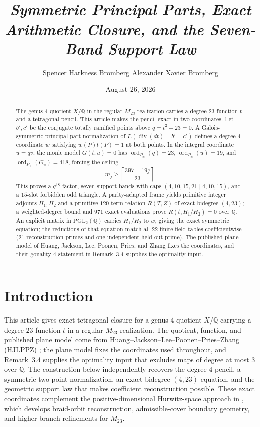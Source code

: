 \documentclass[11pt]{article}
\title{\vspace{-1.15em}{\fontsize{15.5}{18}\selectfont\bfseries Exact Tetragonal Coordinates for the Genus-$4$ $M_{23}$ Quotient}\\[-0.08em]
{\normalsize\itshape Symmetric Principal Parts, Exact Arithmetic Closure, and the Seven-Band Support Law}}
\author{Spencer Harkness Bromberg \quad Alexander Xavier Bromberg}
\date{August 26, 2026}
\newcommand{\Q}{\mathbb Q}
\begin{document}
\maketitle

\begin{abstract}
The genus-$4$ quotient $X/\Q$ in the regular $M_{23}$ realization carries a degree-$23$ function $t$ and a tetragonal pencil.  This article makes the pencil exact in two coordinates.  Let $b',c'$ be the conjugate totally ramified points above $q=t^2+23=0$.  A Galois-symmetric principal-part normalization of $L(\operatorname{div}(dt)-b'-c')$ defines a degree-$4$ coordinate $w$ satisfying $w(P)t(P)=1$ at both points.  In the integral coordinate $u=qv$, the monic model $G(t,u)=0$ has $\operatorname{ord}_{P_\pm}(q)=23$, $\operatorname{ord}_{P_\pm}(u)=19$, and $\operatorname{ord}_{P_\pm}(G_u)=418$, forcing the ceiling
\[
m_j\ge\left\lceil\frac{397-19j}{23}\right\rceil.
\]
This proves a $q^{18}$ factor, seven support bands with caps $(4,10,15,21\mid4,10,15)$, and a $15$-slot forbidden odd triangle.  A parity-adapted frame yields primitive integer adjoints $H_1,H_2$ and a primitive $120$-term relation $R(T,Z)$ of exact bidegree $(4,23)$; a weighted-degree bound and $971$ exact evaluations prove $R(t,H_1/H_2)=0$ over $\Q$.  An explicit matrix in $\mathrm{PGL}_2(\Q)$ carries $H_1/H_2$ to $w$, giving the exact symmetric equation; the reductions of that equation match all $22$ finite-field tables coefficientwise ($21$ reconstruction primes and one independent held-out prime).  The published plane model of Huang, Jackson, Lee, Poonen, Pries, and Zhang fixes the coordinates, and their gonality-$4$ statement in Remark~3.4 supplies the optimality input.
\end{abstract}
\section{Introduction}
This article gives exact tetragonal closure for a genus-$4$ quotient $X/\Q$ carrying a degree-$23$ function $t$ in a regular $M_{23}$ realization.  The quotient, function, and published plane model come from Huang--Jackson--Lee--Poonen--Pries--Zhang (HJLPPZ) \cite{HJLPPZ2026}; the plane model fixes the coordinates used throughout, and Remark~3.4 supplies the optimality input that excludes maps of degree at most $3$ over $\Q$.  The construction below independently recovers the degree-$4$ pencil, a symmetric two-point normalization, an exact bidegree-$(4,23)$ equation, and the geometric support law that makes coefficient reconstruction possible.  These exact coordinates complement the positive-dimensional Hurwitz-space approach in \cite{BrombergBromberg2026}, which develops braid-orbit reconstruction, admissible-cover boundary geometry, and higher-branch refinements for $M_{23}$.
\end{document}

